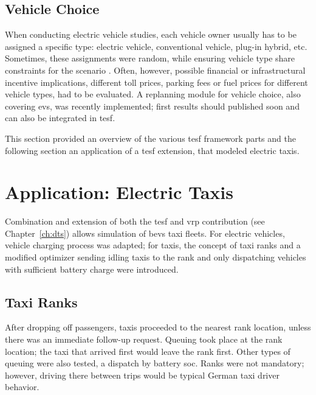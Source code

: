 \subsection{Vehicle Choice}
When conducting electric vehicle studies, each vehicle owner usually has to be assigned a specific type: \eg electric vehicle, conventional vehicle, plug-in hybrid, etc. Sometimes, these assignments were random, while ensuring vehicle type share constraints for the scenario \citep[e.g.,][]{WaraichEtAl_JanssensEtAl_2014}. Often, however, possible financial or infrastructural incentive implications, \eg different toll prices, parking fees or fuel prices for different vehicle types, had to be evaluated. A replanning module for vehicle choice, also covering \glspl{ev}, was recently implemented; first results should published soon and can also be integrated in \gls{tesf}.

This section provided an overview of the various \gls{tesf} framework parts and the following section an application of a \gls{tesf} extension, that modeled electric taxis.

\section{Application: Electric Taxis} %
Combination and extension of both the \gls{tesf} and \gls{vrp} contribution (see Chapter~\ref{ch:dts}) allows simulation of \glspl{bev} taxi fleets.
For electric vehicles, vehicle charging process was adapted; for taxis, the concept of taxi ranks and a modified optimizer sending idling taxis to the rank and only dispatching vehicles with sufficient battery charge were introduced. 

\subsection{Taxi Ranks}
After dropping off passengers, taxis proceeded to the nearest rank location, unless there was an immediate follow-up request. 
Queuing took place at the rank location; the taxi that arrived first would leave the rank first. 
Other types of queuing were also tested, \eg a dispatch by battery \gls{soc}.
Ranks were not mandatory; however, driving there between trips would be typical German taxi driver behavior.

